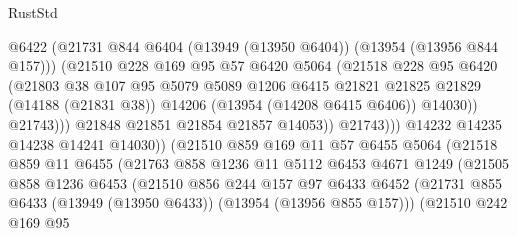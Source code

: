 \begin{lexlean}{RustStd}
\begin{coremodule}
                              @6422
                              (@21731
                                @844
                                @6404
                                (@13949 (@13950 @6404))
                                (@13954 (@13956 @844 @157)))
                              (@21510
                                @228
                                @169
                                @95
                                @57
                                @6420
                                @5064
                                (@21518
                                  @228
                                  @95
                                  @6420
                                  (@21803
                                    @38
                                    @107
                                    @95
                                    @5079
                                    @5089
                                    @1206
                                    @6415
                                    @21821
                                    @21825
                                    @21829
                                    (@14188 (@21831 @38))
                                    @14206
                                    (@13954 (@14208 @6415 @6406))
                                    @14030))
                                @21743)))
                          @21848
                          @21851
                          @21854
                          @21857
                          @14053))
                      @21743)))
                @14232
                @14235
                @14238
                @14241
                @14030))
            (@21510
              @859
              @169
              @11
              @57
              @6455
              @5064
              (@21518
                @859
                @11
                @6455
                (@21763
                  @858
                  @1236
                  @11
                  @5112
                  @6453
                  @4671
                  @1249
                  (@21505
                    @858
                    @1236
                    @6453
                    (@21510
                      @856
                      @244
                      @157
                      @97
                      @6433
                      @6452
                      (@21731 @855 @6433 (@13949 (@13950 @6433)) (@13954 (@13956 @855 @157)))
                      (@21510
                        @242
                        @169
                        @95

\end{coremodule}
\end{lexlean}
